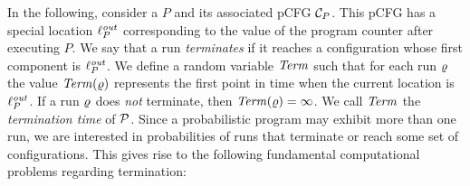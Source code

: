 \smallskip{}
In the following, consider a \PP{} $P$ and its associated pCFG $\mathcal{C}_P$. This 
pCFG has a special location  $\ell_{P}^{\mathit{out}}$ corresponding to the value of 
the program counter after 
executing $P$.
We say that a run 
\emph{terminates} if it reaches a 
configuration whose first component is
$\ell_{P}^{\mathit{out}}$.
%
We define a random variable $\mathit{Term}$
such that for each run $\varrho$ the value $\mathit{Term}(\varrho)$ represents 
the first 
point in time when 
the current location is $\ell_P^{\mathit{out}}$. If a run $\varrho$ does 
\emph{not} 
terminate, then 
$\mathit{Term}(\varrho)=\infty$. We call $\mathit{Term}$ the 
\emph{termination time} of $\mathcal{P}$. 
Since a probabilistic program may exhibit more than one run, we are interested 
in probabilities of runs that terminate or reach some set of configurations. 
This gives rise to the following fundamental computational problems regarding 
termination:

